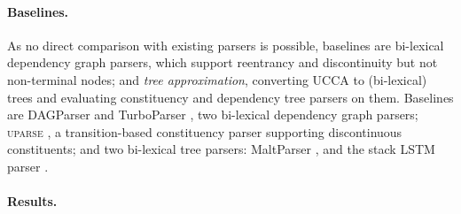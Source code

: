 \documentclass[12pt]{article}
\begin{document}
\paragraph{Baselines.}
As no direct comparison with existing parsers is possible,
baselines are bi-lexical dependency graph parsers,
which support reentrancy and discontinuity but not non-terminal nodes;
and \textit{tree approximation}, converting UCCA to (bi-lexical) trees
and evaluating constituency and dependency tree parsers on them.
Baselines are DAGParser \cite{ribeyre-villemontedelaclergerie-seddah:2014:SemEval} and
TurboParser \cite{almeida-martins:2015:SemEval},
two bi-lexical dependency graph parsers;
\textsc{uparse} \cite{maier-lichte:2016:DiscoNLP},
a transition-based constituency parser supporting discontinuous constituents;
and two bi-lexical tree parsers:
MaltParser \cite{nivre2007maltparser},
and the stack LSTM parser \cite{dyer2015transition}.


\paragraph{Results.}
\end{document}
